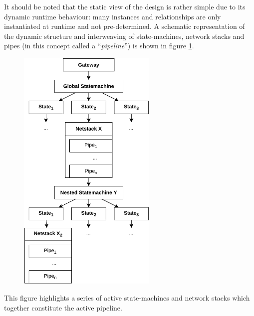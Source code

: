 It should be noted that the static view of the design is rather simple due to its dynamic runtime behaviour: many instances and relationships are only instantiated at runtime and not pre-determined. A schematic representation of the dynamic structure and interweaving of state-machines, network stacks and pipes (in this concept called a \enquote{\emph{pipeline}}) is shown in figure \ref{fig:pipeline}.
\begin{figure}[h]
    \centering
    \includegraphics[height=12cm]{img/ch05/pipeline.pdf}
    \label{fig:pipeline}
\end{figure}This figure highlights a series of active state-machines and network stacks which together constitute the active pipeline. \\
